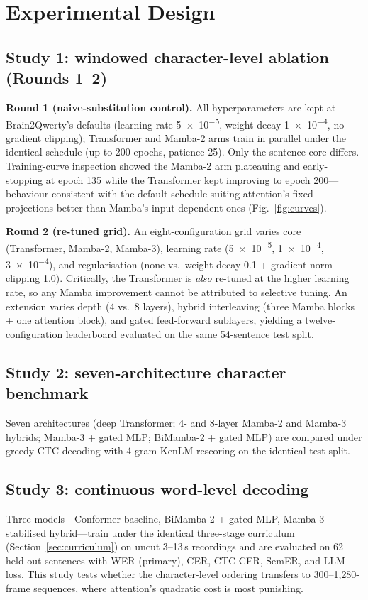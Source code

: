 \documentclass[11pt,a4paper]{report}
\begin{document}
\chapter{Experimental Design}
\label{ch:experiments}

\section{Study 1: windowed character-level ablation (Rounds 1--2)}
\textbf{Round 1 (naive-substitution control).} All hyperparameters are kept
at Brain2Qwerty's defaults (learning rate \num{5e-5}, weight decay
\num{1e-4}, no gradient clipping); Transformer and Mamba-2 arms train in
parallel under the identical schedule (up to 200 epochs, patience 25). Only
the sentence core differs. Training-curve inspection showed the Mamba-2 arm
plateauing and early-stopping at epoch 135 while the Transformer kept
improving to epoch 200---behaviour consistent with the default schedule
suiting attention's fixed projections better than Mamba's input-dependent
ones (Fig.~\ref{fig:curves}).

\textbf{Round 2 (re-tuned grid).} An eight-configuration grid varies core
(Transformer, Mamba-2, Mamba-3), learning rate (\num{5e-5}, \num{1e-4},
\num{3e-4}), and regularisation (none vs.\ weight decay 0.1 + gradient-norm
clipping 1.0). Critically, the Transformer is \emph{also} re-tuned at the
higher learning rate, so any Mamba improvement cannot be attributed to
selective tuning. An extension varies depth (4 vs.\ 8 layers), hybrid
interleaving (three Mamba blocks + one attention block), and gated
feed-forward sublayers, yielding a twelve-configuration leaderboard evaluated
on the same 54-sentence test split.

\section{Study 2: seven-architecture character benchmark}
Seven architectures (deep Transformer; 4- and 8-layer Mamba-2 and Mamba-3
hybrids; Mamba-3 + gated MLP; BiMamba-2 + gated MLP) are compared under
greedy CTC decoding with 4-gram KenLM rescoring on the identical test split.

\section{Study 3: continuous word-level decoding}
Three models---Conformer baseline, BiMamba-2 + gated MLP, Mamba-3 stabilised
hybrid---train under the identical three-stage curriculum
(Section~\ref{sec:curriculum}) on uncut 3--13\,s recordings and are evaluated
on 62 held-out sentences with WER (primary), CER, CTC CER, SemER, and LLM
loss. This study tests whether the character-level ordering transfers to
300--1{,}280-frame sequences, where attention's quadratic cost is most
punishing.
\end{document}
